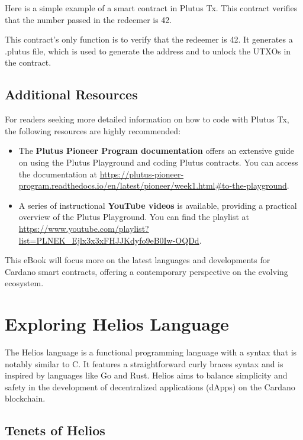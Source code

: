 Here is a simple example of a smart contract in Plutus Tx. This contract verifies that the number passed in the redeemer is 42.




This contract's only function is to verify that the redeemer is 42. It generates a .plutus file, which is used to generate the address and to unlock the UTXOs in the contract.

\subsection{Additional Resources}

For readers seeking more detailed information on how to code with Plutus Tx, the following resources are highly recommended:

\begin{itemize}
    \item The \textbf{Plutus Pioneer Program documentation} offers an extensive guide on using the Plutus Playground and coding Plutus contracts. You can access the documentation at \url{https://plutus-pioneer-program.readthedocs.io/en/latest/pioneer/week1.html#to-the-playground}.
    
    \item A series of instructional \textbf{YouTube videos} is available, providing a practical overview of the Plutus Playground. You can find the playlist at \url{https://www.youtube.com/playlist?list=PLNEK_Ejlx3x3xFHJJKdyfo9eB0Iw-OQDd}.
\end{itemize}

This eBook will focus more on the latest languages and developments for Cardano smart contracts, offering a contemporary perspective on the evolving ecosystem.


\section{Exploring Helios Language} \label{sec:Languages}


The Helios language is a functional programming language with a syntax that is notably similar to C. It features a straightforward curly braces syntax and is inspired by languages like Go and Rust. Helios aims to balance simplicity and safety in the development of decentralized applications (dApps) on the Cardano blockchain.

\subsection{Tenets of Helios}

